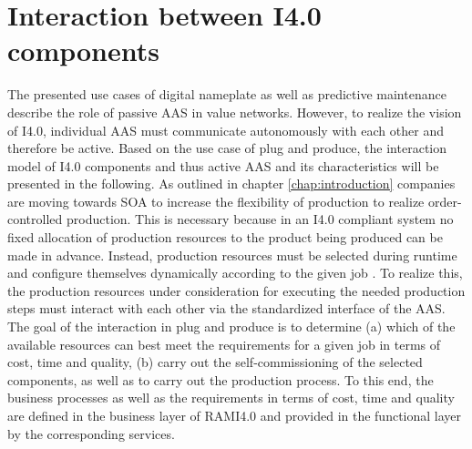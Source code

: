 \section{Interaction between I4.0 components} \label{sec:interaction-i4.0-comp}
The presented use cases of digital nameplate as well as predictive maintenance describe the role of passive \ac{AAS} in value networks. However, to realize the vision of \ac{I4.0}, individual \ac{AAS} must communicate autonomously with each other and therefore be active. Based on the use case of plug and produce, the interaction model of \ac{I4.0} components and thus active \ac{AAS} and its characteristics will be presented in the following. As outlined in chapter \ref{chap:introduction} companies are moving towards \ac{SOA} to increase the flexibility of production to realize order-controlled production. This is necessary because in an \ac{I4.0} compliant system no fixed allocation of production resources to the product being produced can be made in advance. Instead, production resources must be selected during runtime and configure themselves dynamically according to the given job \cite[p. 6]{Bock2016Weiterentwicklung4.0-Komponenten}. To realize this, the production resources under consideration for executing the needed production steps must interact with each other via the standardized interface of the \ac{AAS}. The goal of the interaction in plug and produce is to determine (a) which of the available resources can best meet the requirements for a given job in terms of cost, time and quality, (b) carry out the self-commissioning of the selected components, as well as to carry out the production process. To this end, the business processes as well as the requirements in terms of cost, time and quality are defined in the business layer of \ac{RAMI4.0} and provided in the functional layer by the corresponding services. 

